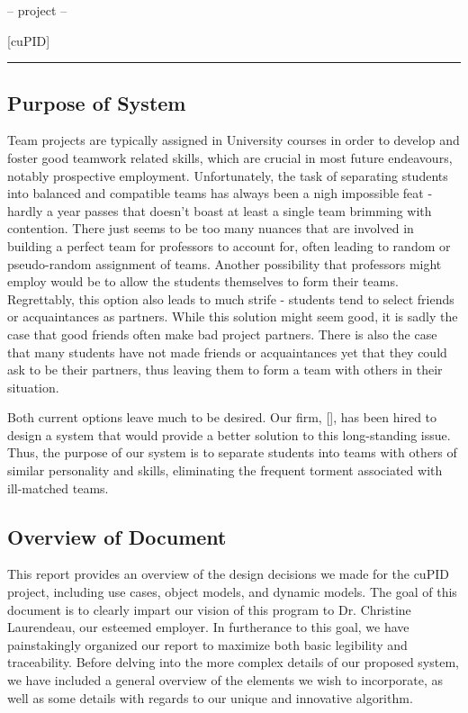 \documentclass[12pt,letterpaper]{article}
\begin{document}
\begin{center}
    -- project --
\end{center}

\begin{center}
	\Huge [cuPID]
\end{center}

\begin{center}
    \rule{0.85\textwidth}{0.5pt}
\end{center}

\subsection{Purpose of System}

Team projects are typically assigned in University courses in order to develop and foster
good teamwork related skills, which are crucial in most future endeavours, notably 
prospective employment. Unfortunately, the task of separating students into balanced 
and compatible teams has always been a nigh impossible feat - hardly a year passes that doesn't
boast at least a single team brimming with  contention. There just seems to be too many
nuances that are involved in building a perfect team for professors to account for, often leading
to random or pseudo-random assignment of teams. Another possibility that professors might employ
would be to allow the students themselves to form their teams. Regrettably, this option also
leads to much strife - students tend to select friends or acquaintances as partners. While this
solution might seem good, it is sadly the case that good friends often make bad project partners. 
There is also the case that many students have not made friends or acquaintances yet that they 
could ask to be their partners, thus leaving them to form a team with others in their situation.

Both current options leave much to be desired. Our firm, [\teamname{}], has been hired
to design a system that would provide a better solution to this long-standing issue. Thus, the purpose of
our system is to separate students into teams with others of similar personality and skills, eliminating 
the frequent torment associated with ill-matched teams.

\subsection{Overview of Document}

This report provides an overview of the design decisions we made for the cuPID project, including 
use cases, object models, and dynamic models. The goal of this document is to clearly impart our vision of this
program to Dr. Christine Laurendeau, our esteemed employer. In furtherance to this goal, we have painstakingly 
organized our report to maximize both basic legibility and traceability. Before delving into the more complex details 
of our proposed system, we have included a general overview of the elements we wish to incorporate, as well as 
some details with regards to our unique and innovative algorithm.
\end{document}
